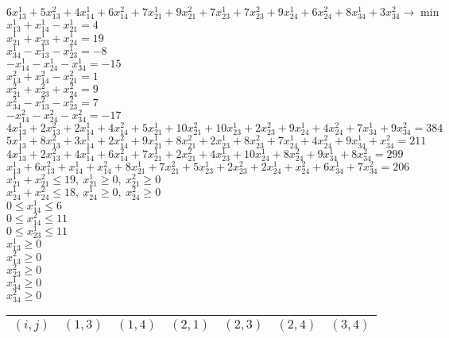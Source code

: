 \documentclass{article}
\begin{document}
\begin{center}
$6x_{13}^{1}+5x_{13}^{2}+4x_{14}^{1}+6x_{14}^{2}+7x_{21}^{1}+9x_{21}^{2}+7x_{23}^{1}+7x_{23}^{2}+9x_{24}^{1}+6x_{24}^{2}+8x_{34}^{1}+3x_{34}^{2}\to\min$\\
\bigskip
$x_{13}^{1}+x_{14}^{1}-x_{21}^{1}=4$\\
$x_{21}^{1}+x_{23}^{1}+x_{24}^{1}=19$\\
$x_{34}^{1}-x_{13}^{1}-x_{23}^{1}=-8$\\
$-x_{14}^{1}-x_{24}^{1}-x_{34}^{1}=-15$\\
\bigskip
$x_{13}^{2}+x_{14}^{2}-x_{21}^{2}=1$\\
$x_{21}^{2}+x_{23}^{2}+x_{24}^{2}=9$\\
$x_{34}^{2}-x_{13}^{2}-x_{23}^{2}=7$\\
$-x_{14}^{2}-x_{24}^{2}-x_{34}^{2}=-17$\\
\bigskip
$4x_{13}^{1}+2x_{13}^{2}+2x_{14}^{1}+4x_{14}^{2}+5x_{21}^{1}+10x_{21}^{2}+10x_{23}^{1}+2x_{23}^{2}+9x_{24}^{1}+4x_{24}^{2}+7x_{34}^{1}+9x_{34}^{2}=384$\\
\bigskip
$5x_{13}^{1}+8x_{13}^{2}+3x_{14}^{1}+2x_{14}^{2}+9x_{21}^{1}+8x_{21}^{2}+2x_{23}^{1}+8x_{23}^{2}+7x_{24}^{1}+4x_{24}^{2}+9x_{34}^{1}+x_{34}^{2}=211$\\
\bigskip
$4x_{13}^{1}+2x_{13}^{2}+4x_{14}^{1}+6x_{14}^{2}+7x_{21}^{1}+2x_{21}^{2}+4x_{23}^{1}+10x_{24}^{1}+8x_{24}^{2}+9x_{34}^{1}+8x_{34}^{2}=299$\\
\bigskip
$x_{13}^{1}+6x_{13}^{2}+x_{14}^{1}+x_{14}^{2}+8x_{21}^{1}+7x_{21}^{2}+5x_{23}^{1}+2x_{23}^{2}+2x_{24}^{1}+x_{24}^{2}+6x_{34}^{1}+7x_{34}^{2}=206$\\
\bigskip
$x_{21}^{1}+x_{21}^{2}\leq19,~x_{21}^{1}\geq0,~x_{21}^{2}\geq0$\\
$x_{24}^{1}+x_{24}^{2}\leq18,~x_{24}^{1}\geq0,~x_{24}^{2}\geq0$\\
\bigskip
$0\leq x_{14}^{1}\leq6$\\$0\leq x_{14}^{2}\leq11$\\$0\leq x_{23}^{1}\leq11$\\\bigskip
$x_{13}^{1}\geq0$\\$x_{13}^{2}\geq0$\\$x_{23}^{2}\geq0$\\$x_{34}^{1}\geq0$\\$x_{34}^{2}\geq0$\\\bigskip
\begin{tabular}{|l||c|c||c|c||c|c||c|c||c|c||c|c|}
\hline$(i, j)$  &   \multicolumn{2}{|c||}{$(1, 3)$} &   \multicolumn{2}{|c||}{$(1, 4)$} &   \multicolumn{2}{|c||}{$(2, 1)$} &   \multicolumn{2}{|c||}{$(2, 3)$} &   \multicolumn{2}{|c||}{$(2, 4)$} &   \multicolumn{2}{|c|}{$(3, 4)$}\\\hline

\end{tabular}
\end{center}
\end{document}
